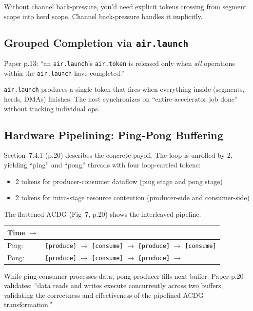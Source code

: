 \documentclass[11pt,a4paper]{article}
\begin{document}
Without channel back-pressure, you'd need explicit tokens crossing from segment
scope into herd scope. Channel back-pressure handles it implicitly.

\subsection{Grouped Completion via \texttt{air.launch}}

Paper p.13: ``an \texttt{air.launch}'s \texttt{air.token} is released only when
\emph{all} operations within the \texttt{air.launch} have completed.''

\texttt{air.launch} produces a single token that fires when everything inside
(segments, herds, DMAs) finishes. The host synchronizes on ``entire accelerator job
done'' without tracking individual ops.

\subsection{Hardware Pipelining: Ping-Pong Buffering}

Section~7.4.1 (p.20) describes the concrete payoff. The loop is unrolled by 2,
yielding ``ping'' and ``pong'' threads with four loop-carried tokens:
\begin{itemize}[leftmargin=2em]
  \item 2 tokens for producer-consumer dataflow (ping stage and pong stage)
  \item 2 tokens for intra-stage resource contention (producer-side and consumer-side)
\end{itemize}

The flattened ACDG (Fig~7, p.20) shows the interleaved pipeline:

\begin{center}
\begin{tabular}{ll}
\toprule
\textbf{Time} $\rightarrow$ & \\
\midrule
Ping: & \texttt{[produce]} $\rightarrow$ \texttt{[consume]} $\rightarrow$
  \texttt{[produce]} $\rightarrow$ \texttt{[consume]} \\
Pong: & \qquad\texttt{[produce]} $\rightarrow$ \texttt{[consume]} $\rightarrow$
  \texttt{[produce]} $\rightarrow$ \\
\bottomrule
\end{tabular}
\end{center}

While ping consumer processes data, pong producer fills next buffer. Paper p.20
validates: ``data reads and writes execute concurrently across two buffers,
validating the correctness and effectiveness of the pipelined ACDG transformation.''
\end{document}
